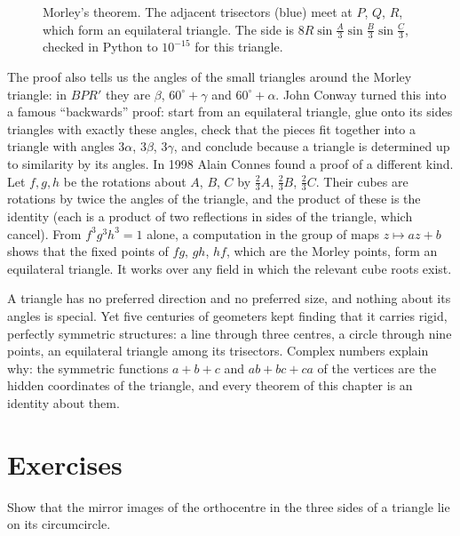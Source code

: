 \begin{figure}[ht]
\centering
{}
\caption{Morley's theorem. The adjacent trisectors (blue) meet at $P$, $Q$, $R$, which form an equilateral triangle. The side is
$8R\sin\frac A3\sin\frac B3\sin\frac C3$, checked in Python to $10^{-15}$ for this triangle.}
\label{fig:morley}
\end{figure}

The proof also tells us the angles of the small triangles around the Morley triangle: in $BPR'$ they are $\beta$, $60^\circ+\gamma$ and
$60^\circ+\alpha$. John Conway turned this into a famous ``backwards'' proof: start from an equilateral triangle, glue onto its sides
triangles with exactly these angles, check that the pieces fit together into a triangle with angles $3\alpha$, $3\beta$, $3\gamma$, and
conclude because a triangle is determined up to similarity by its angles. In 1998 Alain Connes found a proof of a different kind. Let
$f,g,h$ be the rotations about $A$, $B$, $C$ by $\frac23A$, $\frac23B$, $\frac23C$. Their cubes are rotations by twice the angles of the
triangle, and the product of these is the identity (each is a product of two reflections in sides of the triangle, which cancel).
From $f^3g^3h^3=1$ alone, a computation in the group of maps $z\mapsto az+b$ shows that the fixed points of $fg$, $gh$, $hf$, which are the
Morley points, form an equilateral triangle. It works over any field in which the relevant cube roots exist.

\begin{beauty}
A triangle has no preferred direction and no preferred size, and nothing about its angles is special. Yet five centuries of geometers
kept finding that it carries rigid, perfectly symmetric structures: a line through three centres, a circle through nine points, an
equilateral triangle among its trisectors. Complex numbers explain why: the symmetric functions $a+b+c$ and $ab+bc+ca$ of the vertices
are the hidden coordinates of the triangle, and every theorem of this chapter is an identity about them.
\end{beauty}

\section{Exercises}

\begin{exercise}[$\star$]\label{ex:reflectH}
Show that the mirror images of the orthocentre in the three sides of a triangle lie on its circumcircle.
\end{exercise}

